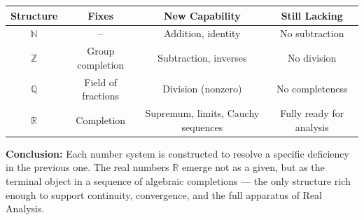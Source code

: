 \documentclass[10pt]{article}
\begin{document}
\begin{tabular}{|c|c|c|c|}
	\hline
	\textbf{Structure} & \textbf{Fixes} & \textbf{New Capability} & \textbf{Still Lacking} \\
	\hline
	$\mathbb{N}$ & -- & Addition, identity & No subtraction \\
	$\mathbb{Z}$ & Group completion & Subtraction, inverses & No division \\
	$\mathbb{Q}$ & Field of fractions & Division (nonzero) & No completeness \\
	$\mathbb{R}$ & Completion & Supremum, limits, Cauchy sequences & Fully ready for analysis \\
	\hline
\end{tabular}

\vspace{1em}

\textbf{Conclusion:} Each number system is constructed to resolve a specific deficiency in the previous one. The real numbers $\mathbb{R}$ emerge not as a given, but as the terminal object in a sequence of algebraic completions — the only structure rich enough to support continuity, convergence, and the full apparatus of Real Analysis.
\end{document}

